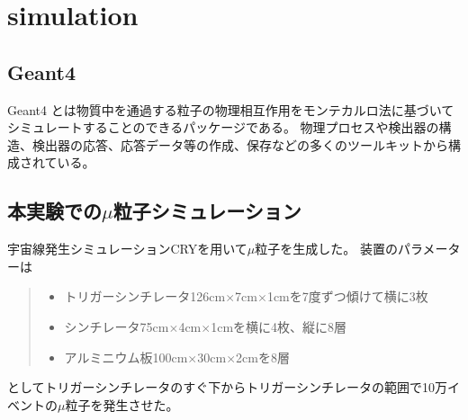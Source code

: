 \chapter{simulation}\label{simulation}
\section{Geant4}
Geant4 とは物質中を通過する粒子の物理相互作用をモンテカルロ法に基づいてシミュレートすることのできるパッケージである。
物理プロセスや検出器の構造、検出器の応答、応答データ等の作成、保存などの多くのツールキットから構成されている。

\section{本実験での$\mu$粒子シミュレーション}
宇宙線発生シミュレーションCRYを用いて$\mu$粒子を生成した。
装置のパラメーターは
    \begin{quote}
        \begin{itemize}
            \item トリガーシンチレータ126cm$\times$7cm$\times$1cmを7度ずつ傾けて横に3枚
            \item シンチレータ75cm$\times$4cm$\times$1cmを横に4枚、縦に8層
            \item アルミニウム板100cm$\times$30cm$\times$2cmを8層
        \end{itemize}
    \end{quote}
としてトリガーシンチレータのすぐ下からトリガーシンチレータの範囲で10万イベントの$\mu$粒子を発生させた。

